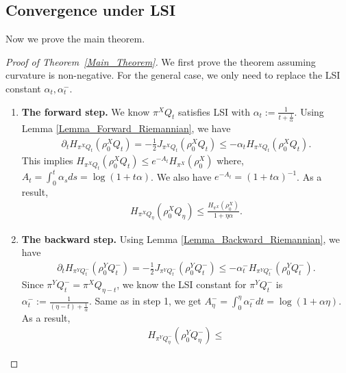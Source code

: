 \subsection{Convergence under LSI}\label{Section_Conv_LSI}
Now we prove the main theorem.

\begin{proof}[Proof of Theorem~\ref{Main_Theorem}]
We first prove the theorem assuming curvature is non-negative. For the general case, we only need to replace the LSI constant $\alpha_{t}, \alpha_{t}^{-}$. 
    \begin{enumerate}
        \item \textbf{The forward step.} 
        We know $\pi^{X} Q_{t}$ satisfies LSI with $\alpha_{t} := \frac{1}{t + \frac{1}{\alpha}}$.
        Using Lemma \ref{Lemma_Forward_Riemannian}, we have 
        \begin{align*}
            \partial_{t} H_{\pi^{X} Q_{t}} (\rho_{0}^{X} Q_{t}) 
            = - \frac{1}{2} J_{\pi^{X} Q_{t}} (\rho_{0}^{X} Q_{t}) 
            \le - \alpha_{t} H_{\pi^{X} Q_{t}} (\rho_{0}^{X} Q_{t}).
        \end{align*}
        This implies $ H_{\pi^{X} Q_{t}} (\rho_{0}^{X} Q_{t}) \le e^{-A_{t}} H_{\pi^{X}} (\rho_{0}^{X})$ 
        where, $A_{t} = \int_{0}^{t} \alpha_{s} ds = \log (1 + t\alpha)$.
        We also have $e^{-A_{t}} = (1 + t\alpha)^{-1}$. As a result, 
        \begin{align*}
            H_{\pi^{X} Q_{\eta}} (\rho_{0}^{X} Q_{\eta}) \le 
            \frac{H_{\pi^{X}} (\rho_{0}^{X})}{1 + \eta \alpha}.
        \end{align*}
        \item \textbf{The backward step.}
        Using Lemma \ref{Lemma_Backward_Riemannian}, we have 
        \begin{align*}
            \partial_{t} H_{\pi^{Y} Q_{t}^{-}} (\rho_{0}^{Y} Q_{t}^{-}) 
            = - \frac{1}{2} J_{\pi^{Y} Q_{t}^{-}} (\rho_{0}^{Y} Q_{t}^{-}) 
            \le - \alpha_{t}^{-} H_{\pi^{Y} Q_{t}^{-}} (\rho_{0}^{Y} Q_{t}^{-}). 
        \end{align*}
        Since $\pi^{Y} Q_{t}^{-} = \pi^{X}Q_{\eta - t }$,
        we know the LSI constant for $\pi^{Y} Q_{t}^{-}$ is $\alpha_{t}^{-} := \frac{1}{(\eta - t) + \frac{1}{\alpha}}$.
        Same as in step 1, we get $A_{\eta}^{-} = \int_{0}^{\eta} \alpha_{t}^{-} dt = \log (1 + \alpha \eta)$.
        As a result, 
        \begin{align*}
            H_{\pi^{Y} Q_{\eta}^{-}} (\rho_{0}^{Y} Q_{\eta}^{-})  \le 

\end{align*}
\end{enumerate}
\end{proof}
